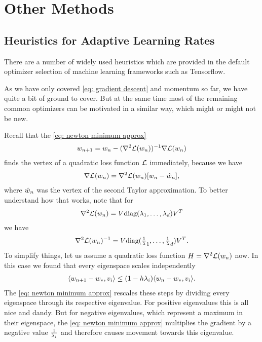 \chapter{Other Methods}\label{chap: other methods}


\section{Heuristics for Adaptive Learning Rates}
\label{sec: heuristics for adpative learning rates}

There are a number of widely used heuristics which are provided in the
default optimizer selection of machine learning frameworks such as Tensorflow.

As we have only covered \ref{eq: gradient descent} and momentum so far, we have
quite a bit of ground to cover. But at the same time most of the remaining
common optimizers \parencite[as reviewed by e.g.][]{ruderOverviewGradientDescent2017}
can be motivated in a similar way, which might or might not be new.

Recall that the \ref{eq: newton minimum approx}
\begin{align*}
	w_{n+1}	= w_n - (\nabla^2\mathcal{L}(w_n))^{-1}\nabla\mathcal{L}(w_n)
\end{align*}
finds the vertex of a quadratic loss function \(\mathcal{L}\) immediately, because we
have
\begin{align*}
	\nabla\mathcal{L}(w_n) = \nabla^2\mathcal{L}(w_n)[w_n - \hat{w}_n],
\end{align*}
where \(\hat{w}_n\) was the vertex of the second Taylor approximation.
To better understand how that works, note that for
\begin{align*}
	\nabla^2\mathcal{L}(w_n) = V \text{diag}(\lambda_1,\dots,\lambda_d)V^T
\end{align*}
we have
\begin{align*}
	\nabla^2\mathcal{L}(w_n)^{-1}
	= V \text{diag}(\tfrac1{\lambda}_1,\dots,\tfrac1{\lambda}_d)V^T.
\end{align*}
To simplify things, let us assume a quadratic loss function
\(H=\nabla^2\mathcal{L}(w_n)\) now.  In this case we found that every
eigenspace scales independently
\begin{align*}
	\langle w_{n+1} - w_*, v_i \rangle
	\le (1-h \lambda_i)\langle w_n - w_*, v_i \rangle.
\end{align*}
The \ref{eq: newton minimum approx} rescales these steps by dividing every
eigenspace through its respective eigenvalue. For positive eigenvalues this is
all nice and dandy. But for negative eigenvalues, which represent a maximum in
their eigenspace, the \ref{eq: newton minimum approx} multiplies the gradient by
a negative value \(\tfrac1{\lambda_i}\) and therefore causes movement towards
this eigenvalue.

